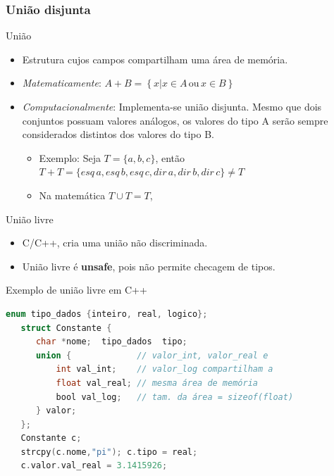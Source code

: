 \documentclass[handout]{beamer}
\begin{document}
\subsubsection{União disjunta}

\begin{frame}{União}
   \begin{itemize}
			\item Estrutura cujos campos compartilham uma área de memória.

			\item \textit{Matematicamente}: $A + B = \left\{ x | x \in A\, \mathrm{ou}\, x \in B \right\}$

			\item \textit{Computacionalmente}: Implementa-se união disjunta. Mesmo que dois conjuntos possuam valores análogos, os valores do tipo A serão sempre considerados distintos dos valores do tipo B.
				\begin{itemize}
					\item Exemplo: Seja $T = \{ a, b, c\}$, então $ T + T =\{ esq\, a, esq\, b, esq\, c, dir\, a, dir\, b, dir\, c \} \neq T$
					\item Na matemática $T \cup T = T$,
				\end{itemize}
		\end{itemize}
\end{frame}



\begin{frame}[fragile]{União livre}
\begin{itemize}
	\item C/C++, cria uma união não discriminada.
    \item União livre é \textbf{unsafe}, pois não permite checagem de tipos.
\end{itemize}

\begin{block}{Exemplo de união livre em C++ }
	\begin{lstlisting}[language=C,numbers=none]
   enum tipo_dados {inteiro, real, logico};
   struct Constante {
      char *nome;  tipo_dados  tipo;
      union {             // valor_int, valor_real e
          int val_int;    // valor_log compartilham a
          float val_real; // mesma área de memória
          bool val_log;   // tam. da área = sizeof(float)
      } valor;
   };
   Constante c;
   strcpy(c.nome,"pi"); c.tipo = real;
   c.valor.val_real = 3.1415926;
	\end{lstlisting}
\end{block}

\end{frame}
\end{document}
